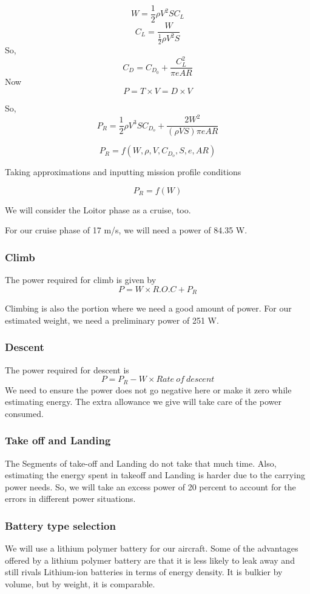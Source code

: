 \documentclass[12 pt]{article}
\begin{document}
$$ W = \frac{1}{2} \rho V^2 S C_L $$
$$ C_L = \frac{W}{\frac{1}{2} \rho V^2 S}$$
So,
$$ C_D = C_{D_0} + \frac{C_L^2}{\pi e AR} $$
Now 
$$ P = T\times V = D\times V $$

So, 
$$ P_R = \frac{1}{2}\rho V^3 S C_{D_o} + \frac{2 W^2}{ (\rho V S) \pi e AR} $$

$$P_R = f(W,\rho,V,C_{D_o},S,e,AR)$$

Taking approximations and inputting mission profile conditions

$$ P_R = f(W) $$

We will consider the Loitor phase as a cruise, too.

For our cruise phase of 17 m/s, we will need a power of 84.35 W.

\subsubsection{Climb }
The power required for climb is given by 
$$ P = W \times R.O.C + P_R $$

Climbing is also the portion where we need a good amount of power. For our estimated weight, we need a preliminary power of 251 W.

\subsubsection{Descent}
The power required for descent is 
$$ P = P_R - W \times Rate\: of\: descent$$
We need to ensure the power does not go negative here or make it zero while estimating energy. The extra allowance we give will take care of the power consumed.

\subsubsection{Take off and Landing}
The Segments of take-off and Landing do not take that much time. Also, estimating the energy spent in takeoff and Landing is harder due to the carrying power needs. So, we will take an excess power of 20 percent to account for the errors in different power situations.

\subsubsection{Battery type selection \cite{Lipobattery}}

We will use a lithium polymer battery for our aircraft. Some of the advantages offered by a lithium polymer battery are that it is less likely to leak away and still rivals Lithium-ion batteries in terms of energy density. It is bulkier by volume, but by weight, it is comparable.
\end{document}
